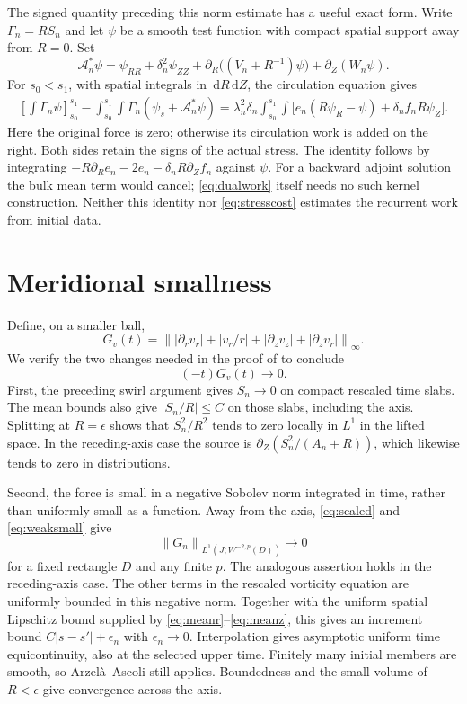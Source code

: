 \documentclass[11pt]{article}
\theoremstyle{remark}
\newcommand{\dd}{\,\mathrm d}
\newcommand{\norm}[1]{\left\lVert#1\right\rVert}
\begin{document}
The signed quantity preceding this norm estimate has a useful exact form.
Write $\Gamma_n=RS_n$ and let $\psi$ be a smooth test function with
compact spatial support away from $R=0$. Set
\[
 \mathcal A_n^*\psi=\psi_{RR}+\delta_n^2\psi_{ZZ}
       +\partial_R\big((V_n+R^{-1})\psi\big)+\partial_Z(W_n\psi).
\]
For $s_0<s_1$, with spatial integrals in $\dd R\dd Z$, the circulation
equation gives
\begin{equation}\label{eq:dualwork}
\begin{split}
 \left[\int\Gamma_n\psi\right]_{s_0}^{s_1}
 -\int_{s_0}^{s_1}\!\!\int
       \Gamma_n(\psi_s+\mathcal A_n^*\psi)
 =\lambda_n^2\delta_n\int_{s_0}^{s_1}\!\!\int
 \big[e_n(R\psi_R-\psi)+\delta_n f_nR\psi_Z\big].
\end{split}
\end{equation}
Here the original force is zero; otherwise its circulation work is added
on the right. Both sides retain the signs of the actual stress.
The identity follows by integrating
$-R\partial_Re_n-2e_n-\delta_nR\partial_Zf_n$ against $\psi$.
For a backward adjoint solution the bulk mean term would cancel;
\eqref{eq:dualwork} itself needs no such kernel construction.
Neither this identity nor \eqref{eq:stresscost} estimates the recurrent
work from initial data.

\section{Meridional smallness}

Define, on a smaller ball,
\[
 G_v(t)=\norm{|\partial_r v_r|+|v_r/r|
                    +|\partial_z v_z|+|\partial_z v_r|}_\infty.
\]
We verify the two changes needed in the proof of
\cite[Proposition~1.5]{CIV} to conclude
\begin{equation}\label{eq:Gsmall}
 (-t)G_v(t)\longrightarrow0.
\end{equation}
First, the preceding swirl argument gives $S_n\to0$ on compact
rescaled time slabs. The mean bounds also give $|S_n/R|\leq C$
on those slabs, including the axis.
Splitting at $R=\epsilon$ shows that $S_n^2/R^2$ tends to zero locally
in $L^1$ in the lifted space. In the receding-axis case the source
is $\partial_Z(S_n^2/(A_n+R))$, which likewise tends to zero
in distributions.

Second, the force is small in a negative Sobolev norm integrated in
time, rather than uniformly small as a function. Away from the axis,
\eqref{eq:scaled} and \eqref{eq:weaksmall} give
\[
 \norm{G_n}_{L^1(J;W^{-2,p}(D))}\longrightarrow0
\]
for a fixed rectangle $D$ and any finite $p$. The analogous assertion
holds in the receding-axis case. The other terms in the rescaled
vorticity equation are uniformly bounded in this negative norm.
Together with the uniform spatial Lipschitz bound supplied by
\eqref{eq:meanr}--\eqref{eq:meanz}, this gives an increment bound
$C|s-s'|+\epsilon_n$ with $\epsilon_n\to0$. Interpolation gives
asymptotic uniform time equicontinuity, also at the selected upper
time. Finitely many initial members are smooth, so Arzel\`a--Ascoli
still applies. Boundedness and the small volume of $R<\epsilon$ give
convergence across the axis.
\end{document}
